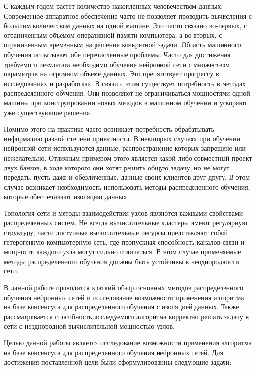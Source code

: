 \documentclass[a4paper,article,14pt]{extarticle}
\begin{document}


\tableofcontents
\pagebreak

С каждым годом растет количество
накопленных человечеством данных. Современное аппаратное обеспечение часто не позволяет проводить вычисления
с большим количеством данных на одной машине. Это часто связано во-первых, с ограниченным объемом оперативной памяти компьютера,
а во-вторых, с ограниченным временным на решение конкретной задачи. Область машинного обучения испытывает обе перечисленные проблемы.
Часто для достижения требуемого результата необходимо обучение нейронной сети с множеством параметров на огромном объеме данных.
Это препятствует прогрессу в исследованиях и разработках.  В связи с этим существует потребность в методах распределенного обучения.
Они позволяют не ограничиваться мощностями одной машины при конструировании новых методов в машинном обучении
и ускоряют уже существующие решения.

Помимо этого на практике часто возникает потребность обрабатывать информацию разной степени приватности. В некоторых случаях
при обучении нейронной сети используются данные, распространение которых запрещено или нежелательно. Отличным примером этого
является какой-либо совместный проект двух банков, в ходе которого они хотят решить общую задачу, но не могут передать, пусть даже
и обезличенные, данные своих клиентов друг другу. В этом случае возникает необходимость использовать методы распределенного обучения, которые
обеспечивают изоляцию данных.

Топология сети и методы взаимодействия узлов являются важными свойствами распределенных систем. Не всегда вычислительные
кластеры имеют регулярную структуру, часто доступные вычислительные ресурсы представляют собой гетерогенную компьютерную сеть,
где пропускная способность каналов связи и мощности каждого узла могут сильно отличаться. В этом случае применяемые методы распределенного
обучения должны быть устойчивы к неоднородности сети.

В данной работе проводится краткий обзор основных методов распределенного обучения нейронных сетей и исследование
возможности применения алгоритма на базе консенсуса для распределенного обучения с изоляцией данных. Также рассматривается
способность исследуемого алгоритма корректно решать задачу в сети с неоднородной вычислительной мощностью узлов.
\pagebreak

Целью данной работы является исследование возможности применения алгоритма на базе консенсуса для распределенного
обучения нейронных сетей. Для достижения поставленной цели были сформулированны следующие задачи:
\end{document}
